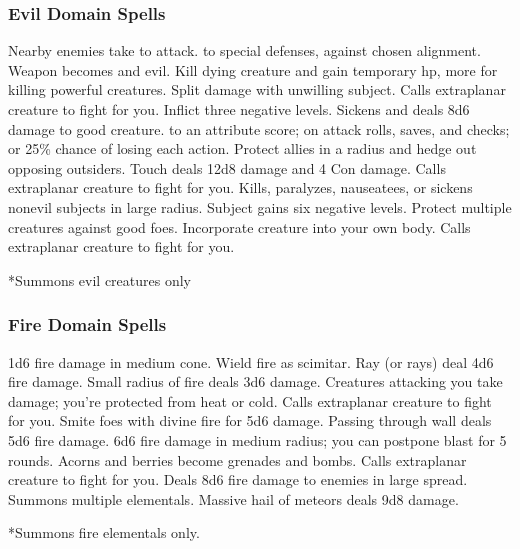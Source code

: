 \subsubsection{Evil Domain Spells}

\begin{spelllist}
   Nearby enemies take  to attack.
    to special defenses,  against chosen alignment.
   Weapon becomes  and evil.
   Kill dying creature and gain temporary hp, more for killing powerful creatures.
   Split damage with unwilling subject.
   Calls extraplanar creature to fight for you.
   Inflict three negative levels.
   Sickens and deals 8d6 damage to good creature.
    to an attribute score;  on attack rolls, saves, and checks; or 25\% chance of losing each action.
   Protect allies in a \areamed radius and hedge out opposing outsiders.
   Touch deals 12d8 damage and 4 Con damage.
   Calls extraplanar creature to fight for you.
   Kills, paralyzes, nauseatees, or sickens nonevil subjects in large radius.
  \spellhead[7]{}
   Subject gains six negative levels.
  \F Protect multiple creatures against good foes. 
   Incorporate creature into your own body.
   Calls extraplanar creature to fight for you.
\end{spelllist}
*Summons evil creatures only

\subsubsection{Fire Domain Spells}

\begin{spelllist}
   1d6 fire damage in medium cone.
  \spellhead[1]{}
   Wield fire as scimitar.
   Ray (or rays) deal 4d6 fire damage.
  \spellhead[3]{}
   Small radius of fire deals 3d6 damage.
   Creatures attacking you take damage; you're protected from heat or cold.
   Calls extraplanar creature to fight for you.
   Smite foes with divine fire for 5d6 damage.
   Passing through wall deals 5d6 fire damage.
   6d6 fire damage in medium radius; you can postpone blast for 5 rounds.
   Acorns and berries become grenades and bombs.
  \spellhead[7]{}
   Calls extraplanar creature to fight for you.
   Deals 8d6 fire damage to enemies in large spread.
   Summons multiple elementals.
   Massive hail of meteors deals 9d8 damage.
\end{spelllist}
*Summons fire elementals only.

